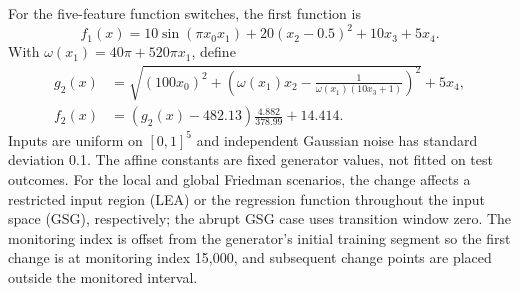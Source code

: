 \documentclass[preprint,12pt]{elsarticle}
\begin{document}
For the five-feature function switches, the first function is
\begin{equation}
f_1(x)=10\sin(\pi x_0x_1)+20(x_2-0.5)^2+10x_3+5x_4.
\end{equation}
With $\omega(x_1)=40\pi+520\pi x_1$, define
\begin{align}
g_2(x)&=\sqrt{(100x_0)^2+\left(\omega(x_1)x_2-\frac{1}{\omega(x_1)(10x_3+1)}\right)^2}+5x_4,\\
f_2(x)&=(g_2(x)-482.13)\frac{4.882}{378.99}+14.414.
\end{align}
Inputs are uniform on $[0,1]^5$ and independent Gaussian noise has standard deviation 0.1. The affine constants are fixed generator values, not fitted on test outcomes. For the local and global Friedman scenarios, the change affects a restricted input region (LEA) or the regression function throughout the input space (GSG), respectively; the abrupt GSG case uses transition window zero. The monitoring index is offset from the generator's initial training segment so the first change is at monitoring index 15,000, and subsequent change points are placed outside the monitored interval.
\end{document}
